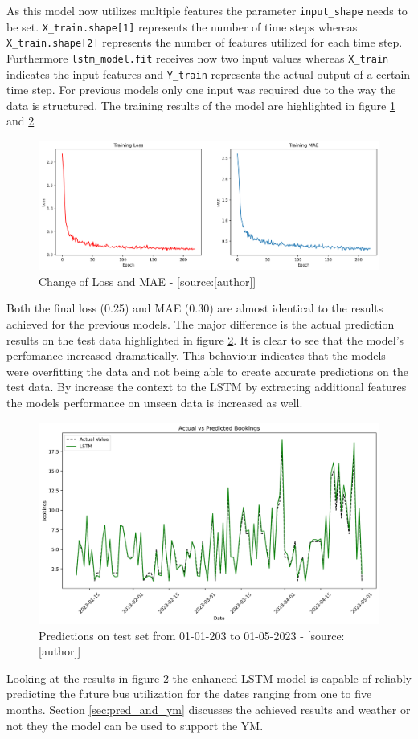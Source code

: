 As this model now utilizes multiple features the parameter \verb|input_shape| needs to be set.  \verb|X_train.shape[1]| represents the number of time steps whereas \verb|X_train.shape[2]| represents the number of features utilized for each time step. Furthermore \verb|lstm_model.fit| receives now two input values whereas \verb|X_train| indicates the input features and \verb|Y_train| represents the actual output of a certain time step. For previous models only one input was required due to the way the data is structured. 
The training results of the model are highlighted in figure \ref{fig:lstm_multi_1_mae} and \ref{fig:lstm_multi_1_prediction} 
\begin{figure}[H]
	\centering
		\includegraphics[width=12cm]{images/lstm_multi_1_mae}
	\caption{Change of Loss and MAE - [source:[author]]}
	\label{fig:lstm_multi_1_mae}
\end{figure}
Both the final loss (0.25) and MAE (0.30) are almost identical to the results achieved for the previous models. The major difference is the actual prediction results on the test data highlighted in figure  \ref{fig:lstm_multi_1_prediction}. It is clear to see that the model's perfomance increased dramatically. This behaviour indicates that the models were overfitting the data and not being able to create accurate predictions on the test data. By increase the context to the LSTM by extracting additional features the models performance on unseen data is increased as well. 
\begin{figure}[H]
	\centering
		\includegraphics[width=14cm]{images/lstm_multi_1_prediction}
	\caption{Predictions on test set from 01-01-203 to 01-05-2023 - [source:[author]]}
	\label{fig:lstm_multi_1_prediction}
\end{figure}
Looking at the results in figure \ref{fig:lstm_multi_1_prediction} the enhanced LSTM model is capable of reliably predicting the future bus utilization for the dates ranging from one to five months. Section \ref{sec:pred_and_ym} discusses the achieved results and weather or not they the model can be used to support the YM.

